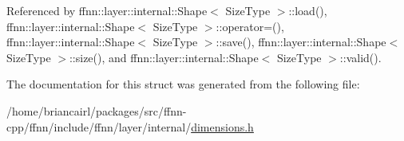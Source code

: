 Referenced by ffnn\-::layer\-::internal\-::\-Shape$<$ Size\-Type $>$\-::load(), ffnn\-::layer\-::internal\-::\-Shape$<$ Size\-Type $>$\-::operator=(), ffnn\-::layer\-::internal\-::\-Shape$<$ Size\-Type $>$\-::save(), ffnn\-::layer\-::internal\-::\-Shape$<$ Size\-Type $>$\-::size(), and ffnn\-::layer\-::internal\-::\-Shape$<$ Size\-Type $>$\-::valid().



The documentation for this struct was generated from the following file\-:\begin{DoxyCompactItemize}
\item 
/home/briancairl/packages/src/ffnn-\/cpp/ffnn/include/ffnn/layer/internal/\hyperlink{dimensions_8h}{dimensions.\-h}\end{DoxyCompactItemize}
